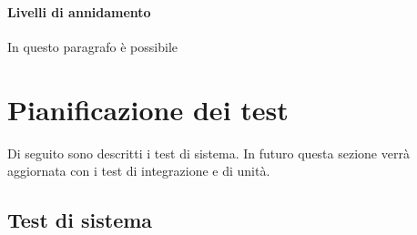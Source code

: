 \documentclass{scalatekids-article}
\begin{document}

\paragraph{Livelli di annidamento}
In questo paragrafo è possibile %

\newpage

\section{Pianificazione dei test}

Di seguito sono descritti i test di sistema. In futuro questa sezione verrà aggiornata con i test di integrazione e di unità.

\subsection{Test di sistema}
\end{document}
